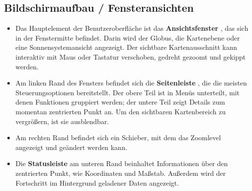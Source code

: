 \documentclass[10pt]{scrreprt}
\begin{document}
\subsection{Bildschirmaufbau / Fensteransichten}
\begin{itemize}
	\item Das Hauptelement der Benutzeroberfläche ist das \textbf{Ansichtsfenster}  , das sich in der Fenstermitte befindet. Darin wird der Globus, die Kartenebene oder eine Sonnensystemansicht angezeigt. Der sichtbare Kartenausschnitt kann interaktiv mit Maus oder Tastatur verschoben, gedreht gezoomt und gekippt werden.
	\item Am linken Rand des Fensters befindet sich die \textbf{Seitenleiste}  , die die meisten Steuerungsoptionen bereitstellt. Der obere Teil ist in Menüs unterteilt, mit denen Funktionen gruppiert werden; der untere Teil zeigt Details zum momentan zentrierten Punkt an. Um den sichtbaren Kartenbereich zu vergrößern, ist sie ausblendbar.
	\item Am rechten Rand  befindet sich ein Schieber, mit dem das Zoomlevel angezeigt und geändert werden kann.
	\item Die \textbf{Statusleiste}  am unteren Rand beinhaltet Informationen über den zentrierten Punkt, wie Koordinaten und Maßstab. Außerdem wird der Fortschritt im Hintergrund geladener Daten angezeigt.
\end{itemize}
\end{document}
